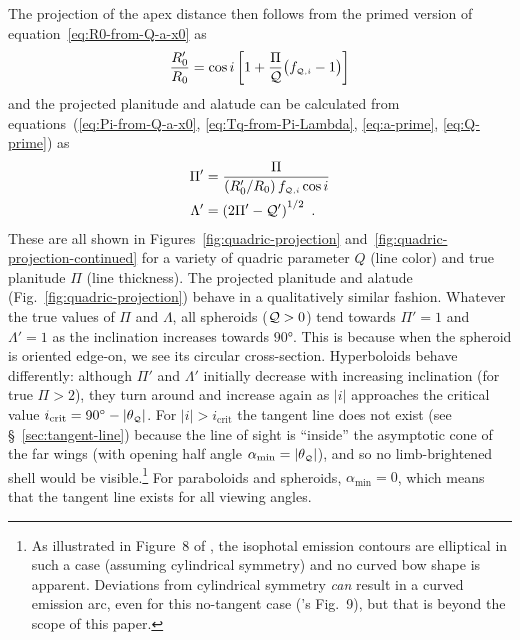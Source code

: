\documentclass[useAMS, usenatbib, a4paper]{mnras}
\providecommand{\abs}[1]{\lvert#1\rvert}
\begin{document}
The projection of the apex distance then follows from the primed
version of equation~\eqref{eq:R0-from-Q-a-x0} as
\begin{equation}
  \label{eq:R0-prime}
  \frac{R_0'}{R_0} =
  \cos i \left[ 1 + \frac{\Pi} {\mathcal{Q}} \bigl(f_{\scriptscriptstyle \mathcal{Q},i} - 1\bigr) \right]
\end{equation}
and the projected planitude and alatude can be calculated from
equations~(\ref{eq:Pi-from-Q-a-x0}, \ref{eq:Tq-from-Pi-Lambda},
\ref{eq:a-prime}, \ref{eq:Q-prime}) as
\begin{align}
  \label{eq:Pi-prime}
  \Pi' &= \frac{\Pi}{(R_0'/R_0)\, f_{\scriptscriptstyle \mathcal{Q},i} \cos i } \\
  \label{eq:Lambda-prime}
  \Lambda' &= \left( 2 \Pi' - \mathcal{Q}' \right)^{1/2} \ .
\end{align}
These are all shown in Figures~\ref{fig:quadric-projection}
and~\ref{fig:quadric-projection-continued} for a variety of quadric
parameter \(Q\) (line color) and true planitude \(\Pi\) (line
thickness).  The projected planitude and alatude
(Fig.~\ref{fig:quadric-projection}) behave in a qualitatively similar
fashion.  Whatever the true values of \(\Pi\) and \(\Lambda\), all spheroids
(\(\mathcal{Q} > 0\)) tend towards \(\Pi' = 1\) and \(\Lambda' = 1\) as the inclination
increases towards \(\ang{90}\).  This is because when the spheroid is
oriented edge-on, we see its circular cross-section.  Hyperboloids
behave differently: although \(\Pi'\) and \(\Lambda'\) initially decrease with
increasing inclination (for true \(\Pi > 2\)), they turn around and
increase again as \(\abs{i}\) approaches the critical value
\(i_{\mathrm{crit}} = \ang{90} - \abs{\thetaQ}\).  For
\(\abs{i} > i_{\mathrm{crit}}\) the tangent line does not exist (see
\S~\ref{sec:tangent-line}) because the line of sight is ``inside'' the
asymptotic cone of the far wings (with opening half angle
\(\alpha_{\mathrm{min}} = \abs{\thetaQ}\)), and so no limb-brightened shell
would be visible.\footnote{%
  As illustrated in Figure~8 of \citet{Graham:2002a}, the isophotal
  emission contours are elliptical in such a case (assuming
  cylindrical symmetry) and no curved bow shape is apparent.
  Deviations from cylindrical symmetry \emph{can} result in a curved
  emission arc, even for this no-tangent case
  (\citeauthor{Graham:2002a}'s Fig.~9), but that is beyond the scope
  of this paper.} For paraboloids and spheroids,
\(\alpha_{\mathrm{min}} = 0\), which means that the tangent line exists for
all viewing angles.
\end{document}
